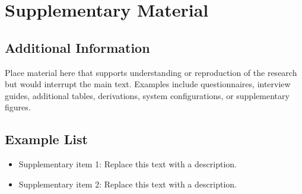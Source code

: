 \chapter{Supplementary Material}

\section{Additional Information}

Place material here that supports understanding or reproduction of the research but would interrupt the main text. Examples include questionnaires, interview guides, additional tables, derivations, system configurations, or supplementary figures.

\section{Example List}

\begin{itemize}
  \item Supplementary item 1: Replace this text with a description.
  \item Supplementary item 2: Replace this text with a description.
\end{itemize}
